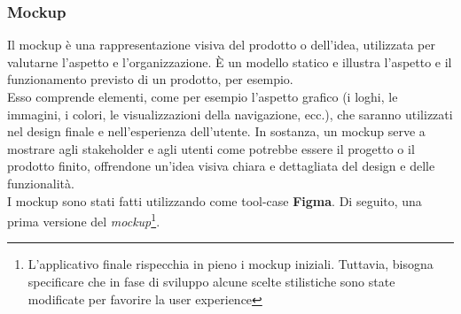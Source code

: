 \documentclass{article}
\begin{document}
			\subsubsection{Mockup}
			Il mockup è una rappresentazione visiva del prodotto o dell’idea, utilizzata per valutarne l’aspetto e l’organizzazione. È un modello statico e illustra l’aspetto e il funzionamento previsto di un prodotto, per esempio.\\
			Esso comprende elementi, come per esempio l’aspetto grafico (i loghi, le immagini, i colori, le visualizzazioni della navigazione, ecc.), che saranno utilizzati nel design finale e nell’esperienza dell’utente.
			In sostanza, un mockup serve a mostrare agli stakeholder e agli utenti come potrebbe essere il progetto o il prodotto finito, offrendone un’idea visiva chiara e dettagliata del design e delle funzionalità.\\
			I mockup sono stati fatti utilizzando come tool-case \textbf{Figma}. Di seguito, una prima versione del \textit{mockup}\footnote{L'applicativo finale rispecchia in pieno i mockup iniziali. Tuttavia, bisogna specificare che in fase di sviluppo alcune scelte stilistiche sono state modificate per favorire la user experience}.
\end{document}
